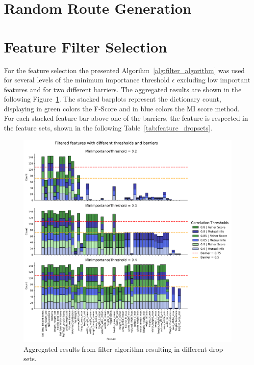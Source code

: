 \clearpage
\section{Random Route Generation}
\label{chap:appendix:RRG}


\clearpage
\section{Feature Filter Selection}
\label{app:feature_selection}

For the feature selection the presented Algorihm~\ref{alg:filter_algorithm} was used for several levels of the minimum importance threshold
$\epsilon$ excluding low important features and for two different barriers. The aggregated results are shown in the following Figure~\ref{fig:feature_filter_parameters}.
The stacked barplots represent the dictionary count, displaying in green colors the \gls{F-Score} and in blue colors the \gls{MI} score method.
For each stacked feature bar above one of the barriers, the feature is respected in the feature sets, shown in the following Table~\ref{tab:feature_dropsets}.

\begin{figure}[ht]
	\centering
	\includegraphics[width=\textwidth,height=0.75\textheight,keepaspectratio]{pictures/feature_filter_facePlot.png}
	\caption{Aggregated results from filter algorithm resulting in different drop sets.}
	\label{fig:feature_filter_parameters}
\end{figure}


